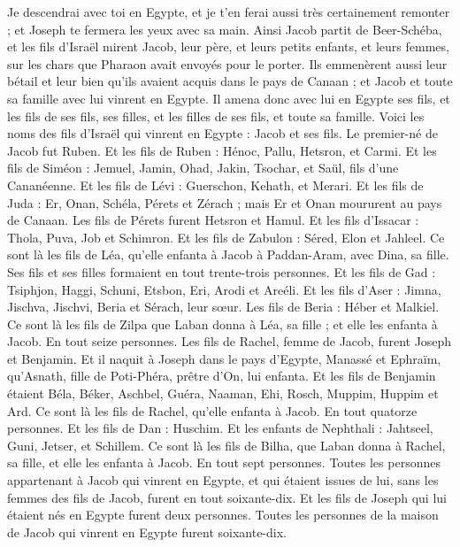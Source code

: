 \begin{multicols}{2}
Je descendrai avec toi en Egypte, et je t'en ferai aussi très certainement remonter ; et Joseph te fermera les yeux avec sa main.
Ainsi Jacob partit de Beer-Schéba, et les fils d'Israël mirent Jacob, leur père, et leurs petits enfants, et leurs femmes, sur les chars que Pharaon avait envoyés pour le porter.
Ils emmenèrent aussi leur bétail et leur bien qu'ils avaient acquis dans le pays de Canaan ; et Jacob et toute sa famille avec lui vinrent en Egypte.
Il amena donc avec lui en Egypte ses fils, et les fils de ses fils, ses filles, et les filles de ses fils, et toute sa famille.
Voici les noms des fils d'Israël qui vinrent en Egypte : Jacob et ses fils. Le premier-né de Jacob fut Ruben.
Et les fils de Ruben : Hénoc, Pallu, Hetsron, et Carmi.
Et les fils de Siméon : Jemuel, Jamin, Ohad, Jakin, Tsochar, et Saül, fils d'une Cananéenne.
Et les fils de Lévi : Guerschon, Kehath, et Merari.
Et les fils de Juda : Er, Onan, Schéla, Pérets et Zérach ; mais Er et Onan moururent au pays de Canaan. Les fils de Pérets furent Hetsron et Hamul.
Et les fils d'Issacar : Thola, Puva, Job et Schimron.
Et les fils de Zabulon : Séred, Elon et Jahleel.
Ce sont là les fils de Léa, qu'elle enfanta à Jacob à Paddan-Aram, avec Dina, sa fille. Ses fils et ses filles formaient en tout trente-trois personnes.
Et les fils de Gad : Tsiphjon, Haggi, Schuni, Etsbon, Eri, Arodi et Areéli.
Et les fils d'Aser : Jimna, Jischva, Jischvi, Beria et Sérach, leur sœur. Les fils de Beria : Héber et Malkiel.
Ce sont là les fils de Zilpa que Laban donna à Léa, sa fille ; et elle les enfanta à Jacob. En tout seize personnes.
Les fils de Rachel, femme de Jacob, furent Joseph et Benjamin.
Et il naquit à Joseph dans le pays d'Egypte, Manassé et Ephraïm, qu'Asnath, fille de Poti-Phéra, prêtre d'On, lui enfanta.
Et les fils de Benjamin étaient Béla, Béker, Aschbel, Guéra, Naaman, Ehi, Rosch, Muppim, Huppim et Ard.
Ce sont là les fils de Rachel, qu'elle enfanta à Jacob. En tout quatorze personnes.
Et les fils de Dan : Huschim.
Et les enfants de Nephthali : Jahtseel, Guni, Jetser, et Schillem.
Ce sont là les fils de Bilha, que Laban donna à Rachel, sa fille, et elle les enfanta à Jacob. En tout sept personnes.
Toutes les personnes appartenant à Jacob qui vinrent en Egypte, et qui étaient issues de lui, sans les femmes des fils de Jacob, furent en tout soixante-dix.
Et les fils de Joseph qui lui étaient nés en Egypte furent deux personnes. Toutes les personnes de la maison de Jacob qui vinrent en Egypte furent soixante-dix.

\end{multicols}
